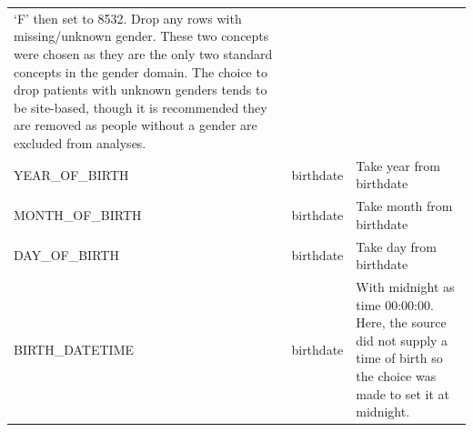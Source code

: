 \documentclass[11pt]{book}
\theoremstyle{definition}
\theoremstyle{definition}
\theoremstyle{definition}
\theoremstyle{remark}
\begin{document}
\begin{longtable}[]{@{}lll@{}}
\begin{minipage}[t]{0.50\columnwidth}
`F' then set to 8532. Drop any rows with missing/unknown gender. These
two concepts were chosen as they are the only two standard concepts in
the gender domain. The choice to drop patients with unknown genders
tends to be site-based, though it is recommended they are removed as
people without a gender are excluded from analyses.\strut
\end{minipage}\tabularnewline
\begin{minipage}[t]{0.28\columnwidth}\raggedright\strut
YEAR\_OF\_BIRTH\strut
\end{minipage} & \begin{minipage}[t]{0.13\columnwidth}\raggedright\strut
birthdate\strut
\end{minipage} & \begin{minipage}[t]{0.50\columnwidth}\raggedright\strut
Take year from birthdate\strut
\end{minipage}\tabularnewline
\begin{minipage}[t]{0.28\columnwidth}\raggedright\strut
MONTH\_OF\_BIRTH\strut
\end{minipage} & \begin{minipage}[t]{0.13\columnwidth}\raggedright\strut
birthdate\strut
\end{minipage} & \begin{minipage}[t]{0.50\columnwidth}\raggedright\strut
Take month from birthdate\strut
\end{minipage}\tabularnewline
\begin{minipage}[t]{0.28\columnwidth}\raggedright\strut
DAY\_OF\_BIRTH\strut
\end{minipage} & \begin{minipage}[t]{0.13\columnwidth}\raggedright\strut
birthdate\strut
\end{minipage} & \begin{minipage}[t]{0.50\columnwidth}\raggedright\strut
Take day from birthdate\strut
\end{minipage}\tabularnewline
\begin{minipage}[t]{0.28\columnwidth}\raggedright\strut
BIRTH\_DATETIME\strut
\end{minipage} & \begin{minipage}[t]{0.13\columnwidth}\raggedright\strut
birthdate\strut
\end{minipage} & \begin{minipage}[t]{0.50\columnwidth}\raggedright\strut
With midnight as time 00:00:00. Here, the source did not supply a time
of birth so the choice was made to set it at midnight.\strut

\end{minipage}
\end{longtable}
\end{document}
